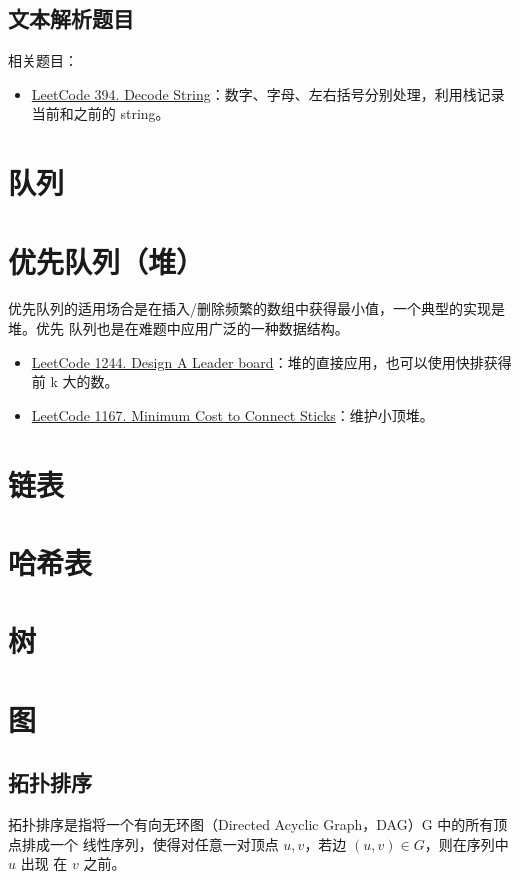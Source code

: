 \subsection{文本解析题目}

相关题目：

\begin{itemize}
  \item 
    \href{https://leetcode.com/problems/decode-string/}{LeetCode 394. Decode
      String}：数字、字母、左右括号分别处理，利用栈记录当前和之前的 string。
\end{itemize}

\section{队列}

\section{优先队列（堆）}
优先队列的适用场合是在插入/删除频繁的数组中获得最小值，一个典型的实现是堆。优先
队列也是在难题中应用广泛的一种数据结构。

\begin{itemize}
  \item
    \href{https://leetcode.com/problems/design-a-leaderboard}{LeetCode 1244.
      Design A Leader board}：堆的直接应用，也可以使用快排获得前 k 大的数。
  \item
    \href{https://leetcode.com/problems/minimum-cost-to-connect-sticks}{LeetCode
      1167. Minimum Cost to Connect Sticks}：维护小顶堆。
\end{itemize}

\section{链表}

\section{哈希表}

\section{树}

\section{图}

\subsection{拓扑排序}
拓扑排序是指将一个有向无环图（Directed Acyclic Graph，DAG）G 中的所有顶点排成一个
线性序列，使得对任意一对顶点 $u, v$，若边 $(u, v) \in G$，则在序列中 $u$ 出现
在 $v$ 之前。


